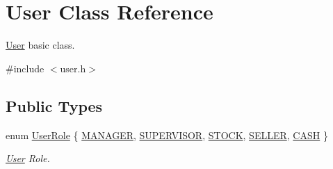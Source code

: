 \hypertarget{class_user}{\section{\-User \-Class \-Reference}
\label{class_user}
}


\hyperlink{class_user}{\-User} basic class.  




{\ttfamily \#include $<$user.\-h$>$}

\subsection*{\-Public \-Types}
\begin{DoxyCompactItemize}
\item 
enum \hyperlink{class_user_a43f49d6a3bf5f000aea476bc641949b0}{\-User\-Role} \{ \*
\hyperlink{class_user_a43f49d6a3bf5f000aea476bc641949b0a5cabe47a239f4de61e963cad9085186a}{\-M\-A\-N\-A\-G\-E\-R}, 
\hyperlink{class_user_a43f49d6a3bf5f000aea476bc641949b0afc6d2f03c65ece2c4c0d23cb56715173}{\-S\-U\-P\-E\-R\-V\-I\-S\-O\-R}, 
\hyperlink{class_user_a43f49d6a3bf5f000aea476bc641949b0a45f2c2b96e074703a1b0db034ee7a4b6}{\-S\-T\-O\-C\-K}, 
\hyperlink{class_user_a43f49d6a3bf5f000aea476bc641949b0ab5c4888daf5151f7ae2b4c9a3e56d71a}{\-S\-E\-L\-L\-E\-R}, 
\*
\hyperlink{class_user_a43f49d6a3bf5f000aea476bc641949b0af27b376d36b3828c197fa3d4ae855766}{\-C\-A\-S\-H}
 \}
\begin{DoxyCompactList}\small\item\em \hyperlink{class_user}{\-User} \-Role. \end{DoxyCompactList}\end{DoxyCompactItemize}
